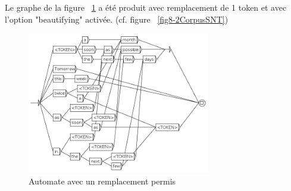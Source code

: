 Le graphe de la figure ~\ref{fig8-7GRF1replace} a été produit avec remplacement de 1 token et avec
l'option "beautifying" activée. (cf. figure ~\ref{fig8-2CorpusSNT})
\begin{figure}[h!]
	\begin{center}
		\includegraphics[width=8cm]{resources/img/fig8-7GRF1replace.png}
		\caption{Automate avec un remplacement permis\label{fig8-7GRF1replace}}
	\end{center}
\end{figure}
